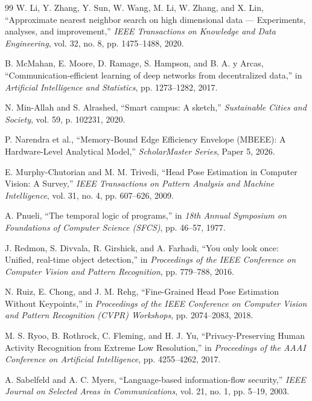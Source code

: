 \documentclass[12pt,a4paper,oneside]{report}
\begin{document}
\begin{thebibliography}{99}
W. Li, Y. Zhang, Y. Sun, W. Wang, M. Li, W. Zhang, and X. Lin, ``Approximate nearest neighbor search on high dimensional data --- Experiments, analyses, and improvement,'' \textit{IEEE Transactions on Knowledge and Data Engineering}, vol. 32, no. 8, pp. 1475--1488, 2020.

B. McMahan, E. Moore, D. Ramage, S. Hampson, and B. A. y Arcas, ``Communication-efficient learning of deep networks from decentralized data,'' in \textit{Artificial Intelligence and Statistics}, pp. 1273--1282, 2017.

N. Min-Allah and S. Alrashed, ``Smart campus: A sketch,'' \textit{Sustainable Cities and Society}, vol. 59, p. 102231, 2020.

P. Narendra et al., ``Memory-Bound Edge Efficiency Envelope (MBEEE): A Hardware-Level Analytical Model,'' \textit{ScholarMaster Series}, Paper 5, 2026.

E. Murphy-Chutorian and M. M. Trivedi, ``Head Pose Estimation in Computer Vision: A Survey,'' \textit{IEEE Transactions on Pattern Analysis and Machine Intelligence}, vol. 31, no. 4, pp. 607--626, 2009.

A. Pnueli, ``The temporal logic of programs,'' in \textit{18th Annual Symposium on Foundations of Computer Science (SFCS)}, pp. 46--57, 1977.

J. Redmon, S. Divvala, R. Girshick, and A. Farhadi, ``You only look once: Unified, real-time object detection,'' in \textit{Proceedings of the IEEE Conference on Computer Vision and Pattern Recognition}, pp. 779--788, 2016.

N. Ruiz, E. Chong, and J. M. Rehg, ``Fine-Grained Head Pose Estimation Without Keypoints,'' in \textit{Proceedings of the IEEE Conference on Computer Vision and Pattern Recognition (CVPR) Workshops}, pp. 2074--2083, 2018.

M. S. Ryoo, B. Rothrock, C. Fleming, and H. J. Yu, ``Privacy-Preserving Human Activity Recognition from Extreme Low Resolution,'' in \textit{Proceedings of the AAAI Conference on Artificial Intelligence}, pp. 4255--4262, 2017.

A. Sabelfeld and A. C. Myers, ``Language-based information-flow security,'' \textit{IEEE Journal on Selected Areas in Communications}, vol. 21, no. 1, pp. 5--19, 2003.


\end{thebibliography}
\end{document}
